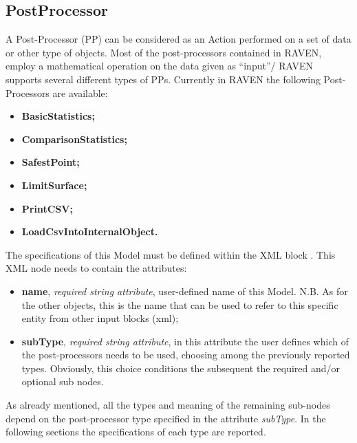 \subsection{PostProcessor}
\label{sec:models_postProcessor}
A Post-Processor (PP) can be considered as an Action performed on a set of data
or other type of objects.
%
Most of the post-processors contained in RAVEN, employ a mathematical operation
on the data given as ``input''/
RAVEN supports several different types of PPs.
%
Currently in RAVEN the following Post-Processors are available:
\begin{itemize}
  \item \textbf{BasicStatistics;}
  \item \textbf{ComparisonStatistics;}
  \item \textbf{SafestPoint;}
  \item \textbf{LimitSurface;}
  \item \textbf{PrintCSV;}
  \item \textbf{LoadCsvIntoInternalObject.}
\end{itemize}
The specifications of this Model must be defined within the XML block
.
%
This XML node needs to contain the attributes:
\vspace{-5mm}
\begin{itemize}
  \itemsep0em
  \item \textbf{name}, \textit{required string attribute}, user-defined name of
  this Model.
  N.B.
  As for the other objects, this is the name that can be used to refer to this
  specific entity from other input blocks (xml);
  \item \textbf{subType}, \textit{required string attribute}, in this attribute
  the user defines which of the post-processors needs to be used, choosing among
  the previously reported types.
  Obviously, this choice conditions the subsequent the required and/or optional
   sub nodes.
\end{itemize}
\vspace{-5mm}
As already mentioned, all the types and meaning of the remaining sub-nodes
depend on the post-processor type specified in the attribute \textit{subType}.
%
In the following sections the specifications of each type are reported.
%
